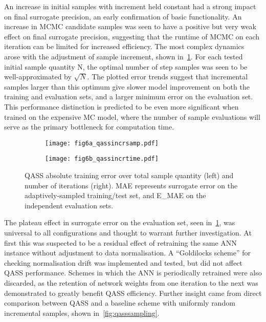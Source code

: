 An increase in initial samples with increment held constant had a strong impact on final surrogate precision, an early confirmation of basic functionality. An increase in MCMC candidate samples was seen to have a positive but very weak effect on final surrogate precision, suggesting that the runtime of MCMC on each iteration can be limited for increased efficiency. The most complex dynamics arose with the adjustment of sample increment, shown in~\cref{fig:qassincr}. For each tested initial sample quantity N, the optimal number of step samples was seen to be well-approximated by $\sqrt{N}$. The plotted error trends suggest that
incremental samples larger than this optimum give slower model improvement on both the training and evaluation sets, and a larger minimum error on the evaluation set. This performance distinction is predicted to be even more significant when trained on the expensive MC model, where the number of sample evaluations will serve as the primary bottleneck for computation time.
\begin{figure}[h!]
    \centering
    \begin{subfigure}[t]{0.5\textwidth}
        \centering
        \texttt{[image: fig6a\_qassincrsamp.pdf]}
    \end{subfigure}%
    \hfill
    \begin{subfigure}[t]{0.5\textwidth}
        \centering
        \texttt{[image: fig6b\_qassincrtime.pdf]}
    \end{subfigure}
    \caption{QASS absolute training error over total sample quantity (left) and number of iterations (right). MAE represents surrogate error on the adaptively-sampled training/test set, and E\_MAE on the independent evaluation sets.}
    \label{fig:qassincr}
\end{figure}

The plateau effect in surrogate error on the evaluation set, seen
in~\cref{fig:qassincr}, was universal to all configurations and thought to
warrant further investigation. At first this was suspected to be a residual
effect of retraining the same ANN instance without adjustment to data
normalisation. A ``Goldilocks scheme'' for checking normalisation drift was
implemented and tested, but did not affect QASS performance. Schemes in which
the ANN is periodically retrained were also discarded, as the retention of
network weights from one iteration to the next was demonstrated to greatly
benefit QASS efficiency. Further insight came from direct comparison between
QASS and a baseline scheme with uniformly random incremental samples, shown
in~\cref{fig:qasssampling}.

